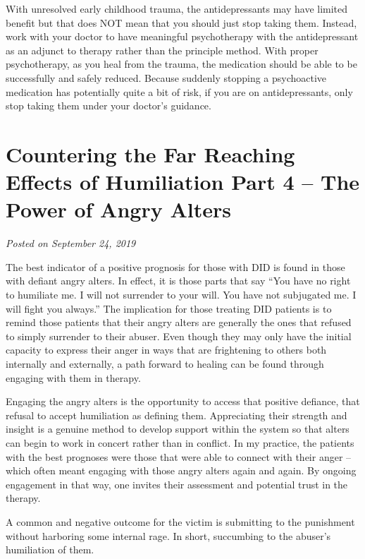 \documentclass[]{book}
\begin{document}
With unresolved early childhood trauma, the antidepressants may have limited benefit but that does NOT mean that you should just stop taking them. Instead, work with your doctor to have meaningful psychotherapy with the antidepressant as an adjunct to therapy rather than the principle method. With proper psychotherapy, as you heal from the trauma, the medication should be able to be successfully and safely reduced. Because suddenly stopping a psychoactive medication has potentially quite a bit of risk, if you are on antidepressants, only stop taking them under your doctor's guidance.

\hypertarget{countering-the-far-reaching-effects-of-humiliation-part-4-the-power-of-angry-alters}{%
\section{Countering the Far Reaching Effects of Humiliation Part 4 -- The Power of Angry Alters}\label{countering-the-far-reaching-effects-of-humiliation-part-4-the-power-of-angry-alters}}

\emph{Posted on September 24, 2019}

The best indicator of a positive prognosis for those with DID is found in those with defiant angry alters. In effect, it is those parts that say ``You have no right to humiliate me. I will not surrender to your will. You have not subjugated me. I will fight you always.'' The implication for those treating DID patients is to remind those patients that their angry alters are generally the ones that refused to simply surrender to their abuser. Even though they may only have the initial capacity to express their anger in ways that are frightening to others both internally and externally, a path forward to healing can be found through engaging with them in therapy.

Engaging the angry alters is the opportunity to access that positive defiance, that refusal to accept humiliation as defining them. Appreciating their strength and insight is a genuine method to develop support within the system so that alters can begin to work in concert rather than in conflict. In my practice, the patients with the best prognoses were those that were able to connect with their anger -- which often meant engaging with those angry alters again and again. By ongoing engagement in that way, one invites their assessment and potential trust in the therapy.

A common and negative outcome for the victim is submitting to the punishment without harboring some internal rage. In short, succumbing to the abuser's humiliation of them.
\end{document}
